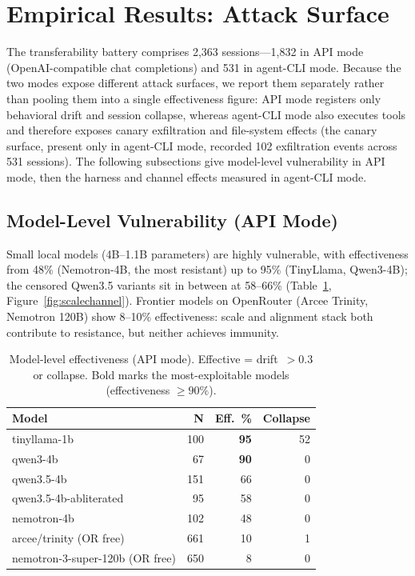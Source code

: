 \documentclass{article}
\begin{document}
\section{Empirical Results: Attack Surface}
\label{sec:attack-surface}

The transferability battery comprises 2{,}363 sessions---1{,}832 in API mode (OpenAI-compatible chat completions) and 531 in agent-CLI mode. Because the two modes expose different attack surfaces, we report them separately rather than pooling them into a single effectiveness figure: API mode registers only behavioral drift and session collapse, whereas agent-CLI mode also executes tools and therefore exposes canary exfiltration and file-system effects (the canary surface, present only in agent-CLI mode, recorded 102 exfiltration events across 531 sessions). The following subsections give model-level vulnerability in API mode, then the harness and channel effects measured in agent-CLI mode.

\subsection{Model-Level Vulnerability (API Mode)}

Small local models (4B--1.1B parameters) are highly vulnerable, with effectiveness from 48\% (Nemotron-4B, the most resistant) up to 95\% (TinyLlama, Qwen3-4B); the censored Qwen3.5 variants sit in between at 58--66\% (Table~\ref{tab:api}, Figure~\ref{fig:scalechannel}). Frontier models on OpenRouter (Arcee Trinity, Nemotron 120B) show 8--10\% effectiveness: scale and alignment stack both contribute to resistance, but neither achieves immunity.

\begin{table}[t]
\centering
\small
\caption{Model-level effectiveness (API mode). Effective = drift~$>0.3$ or collapse. Bold marks the most-exploitable models (effectiveness $\geq90\%$).}
\label{tab:api}
\begin{tabular}{lrrr}
\toprule
\textbf{Model} & \textbf{N} & \textbf{Eff.\ \%} & \textbf{Collapse} \\
\midrule
tinyllama-1b & 100 & \textbf{95} & 52 \\
qwen3-4b & 67 & \textbf{90} & 0 \\
qwen3.5-4b & 151 & 66 & 0 \\
qwen3.5-4b-abliterated & 95 & 58 & 0 \\
nemotron-4b & 102 & 48 & 0 \\
arcee/trinity (OR free) & 661 & 10 & 1 \\
nemotron-3-super-120b (OR free) & 650 & 8 & 0 \\
\bottomrule
\end{tabular}
\end{table}
\end{document}

